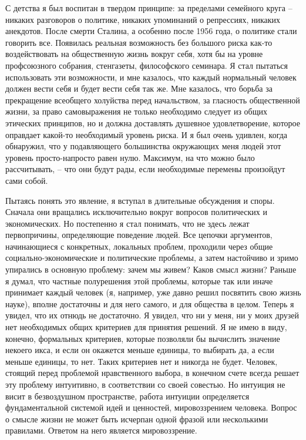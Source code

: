 \documentclass{book}
\begin{document}
С детства я был воспитан в твердом принципе: за пределами семейного круга -- никаких разговоров о политике, никаких упоминаний о репрессиях, никаких анекдотов. После смерти Сталина, а особенно после 1956 года, о политике стали говорить все. Появилась реальная возможность без большого риска как-то воздействовать на общественную жизнь вокруг себя, хотя бы на уровне профсоюзного собрания, стенгазеты, фило­софского семинара. Я стал пытаться использовать эти возмож­ности, и мне казалось, что каждый нормальный человек должен вести себя и будет вести себя так же. Мне казалось, что борьба за прекращение всеобщего холуйства перед начальством, за гласность общественной жизни, за право самовыражения не только необходимо следует из общих этических принципов, но и должна доставлять душевное удовлетворение, которое оправдает какой-то необходимый уровень риска. И я был очень удивлен, когда обнаружил, что у подавляющего большинства окружающих меня людей этот уровень просто-напросто равен нулю. Максимум, на что можно было 
рассчитывать, -- что они будут рады, если необходимые перемены произойдут сами собой.

Пытаясь понять это явление, я вступал в длительные обсуж­дения и споры. Сначала они вращались исключительно вокруг вопросов политических и экономических. Но постепенно я стал понимать, что не здесь лежат первопричины, определяющие поведение людей. Все цепочки аргументов, начинающиеся с конкретных, локальных проблем, проходили через общие социально-экономические и политические проблемы, а затем настойчиво и зримо упирались в основную проблему: зачем мы живем? Каков смысл жизни? Раньше я думал, что частные полурешения этой проблемы, которые так или иначе принимает каждый человек (я, например, уже давно решил посвятить свою жизнь науке), вполне достаточны и для него самого, и для общества в целом. Теперь я увидел, что их отнюдь не достаточно. Я увидел, что ни у меня, ни у моих друзей нет необходимых общих критериев для принятия решений. Я не имею в виду, конечно, формальных  критериев, которые позволяли бы вычислить значение некоего икса, и если он окажется меньше единицы, то выбирать да,  а если меньше единицы,
 то нет.  Таких критериев нет и никогда не будет. Человек, стоящий перед проблемой нравственного выбора, в конечном счете всегда решает эту проблему интуитивно, в соответствии со своей совестью. Но интуиция не висит в безвоздушном пространстве, работа интуиции определяется фундаментальной системой идей и цен­ностей, мировоззрением человека. Вопрос о смысле жизни не может быть исчерпан одной фразой или несколькими правилами. Ответом на него является мировоззрение.
\end{document}
